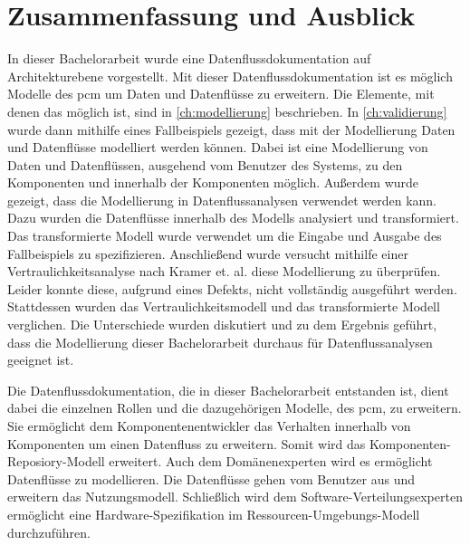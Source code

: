 
\chapter{Zusammenfassung und Ausblick}
\label{ch:zusammenfassung}

In dieser Bachelorarbeit wurde eine Datenflussdokumentation auf Architekturebene vorgestellt. Mit dieser Datenflussdokumentation ist es möglich Modelle des \gls{pcm} um Daten und Datenflüsse zu erweitern. Die Elemente, mit denen das möglich ist, sind in \autoref{ch:modellierung} beschrieben. In \autoref{ch:validierung} wurde dann mithilfe eines Fallbeispiels gezeigt, dass mit der Modellierung Daten und Datenflüsse modelliert werden können. Dabei ist eine Modellierung von Daten und Datenflüssen, ausgehend vom Benutzer des Systems, zu den Komponenten und innerhalb der Komponenten möglich. Außerdem wurde gezeigt, dass die Modellierung in Datenflussanalysen verwendet werden kann. Dazu wurden die Datenflüsse innerhalb des Modells analysiert und transformiert. Das transformierte Modell wurde verwendet um die Eingabe und Ausgabe des Fallbeispiels zu spezifizieren. Anschließend wurde versucht mithilfe einer Vertraulichkeitsanalyse nach Kramer et. al. \cite{Kramera} diese Modellierung zu überprüfen. Leider konnte diese, aufgrund eines Defekts, nicht vollständig ausgeführt werden. Stattdessen wurden das Vertraulichkeitsmodell und das transformierte Modell verglichen. Die Unterschiede wurden diskutiert und zu dem Ergebnis geführt, dass die Modellierung dieser Bachelorarbeit durchaus für Datenflussanalysen geeignet ist. \par 
Die Datenflussdokumentation, die in dieser Bachelorarbeit entstanden ist, dient dabei die einzelnen Rollen und die dazugehörigen Modelle, des \gls{pcm}, zu erweitern. Sie ermöglicht dem Komponentenentwickler das Verhalten innerhalb von Komponenten um einen Datenfluss zu erweitern. Somit wird das Komponenten-Reposiory-Modell erweitert. Auch dem Domänenexperten wird es ermöglicht Datenflüsse zu modellieren. Die Datenflüsse gehen vom Benutzer aus und erweitern das Nutzungsmodell. Schließlich wird dem Software-Verteilungsexperten ermöglicht eine Hardware-Spezifikation im Ressourcen-Umgebungs-Modell durchzuführen. \par
